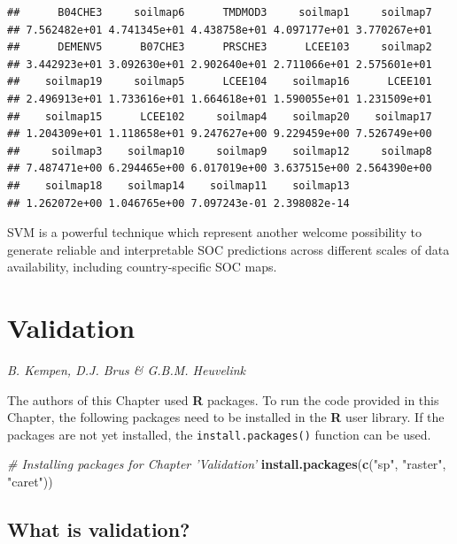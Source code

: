 \documentclass[10pt,b5paper,]{book}
\newenvironment{Shaded}{\begin{snugshade}}{\end{snugshade}}
\newcommand{\CommentTok}[1]{\textcolor[rgb]{0.56,0.35,0.01}{\textit{#1}}}
\newcommand{\KeywordTok}[1]{\textcolor[rgb]{0.13,0.29,0.53}{\textbf{#1}}}
\newcommand{\NormalTok}[1]{#1}
\newcommand{\StringTok}[1]{\textcolor[rgb]{0.31,0.60,0.02}{#1}}
\theoremstyle{definition}
\theoremstyle{definition}
\theoremstyle{definition}
\theoremstyle{remark}
\begin{document}
\begin{verbatim}
##      B04CHE3     soilmap6      TMDMOD3     soilmap1     soilmap7 
## 7.562482e+01 4.741345e+01 4.438758e+01 4.097177e+01 3.770267e+01 
##      DEMENV5      B07CHE3      PRSCHE3      LCEE103     soilmap2 
## 3.442923e+01 3.092630e+01 2.902640e+01 2.711066e+01 2.575601e+01 
##    soilmap19     soilmap5      LCEE104    soilmap16      LCEE101 
## 2.496913e+01 1.733616e+01 1.664618e+01 1.590055e+01 1.231509e+01 
##    soilmap15      LCEE102     soilmap4    soilmap20    soilmap17 
## 1.204309e+01 1.118658e+01 9.247627e+00 9.229459e+00 7.526749e+00 
##     soilmap3    soilmap10     soilmap9    soilmap12     soilmap8 
## 7.487471e+00 6.294465e+00 6.017019e+00 3.637515e+00 2.564390e+00 
##    soilmap18    soilmap14    soilmap11    soilmap13 
## 1.262072e+00 1.046765e+00 7.097243e-01 2.398082e-14
\end{verbatim}

SVM is a powerful technique which represent another welcome possibility
to generate reliable and interpretable SOC predictions across different
scales of data availability, including country-specific SOC maps.

\hypertarget{chvalidation}{%
\chapter{Validation}\label{chvalidation}}

\emph{B. Kempen, D.J. Brus \& G.B.M. Heuvelink}

The authors of this Chapter used \textbf{R} packages. To run the code
provided in this Chapter, the following packages need to be installed in
the \textbf{R} user library. If the packages are not yet installed, the
\texttt{install.packages()} function can be used.

\begin{Shaded}
\begin{Highlighting}[]
\CommentTok{# Installing packages for Chapter 'Validation'}
\KeywordTok{install.packages}\NormalTok{(}\KeywordTok{c}\NormalTok{(}\StringTok{"sp"}\NormalTok{, }\StringTok{"raster"}\NormalTok{, }\StringTok{"caret"}\NormalTok{))}
\end{Highlighting}
\end{Shaded}

\hypertarget{what-is-validation}{%
\section{What is validation?}\label{what-is-validation}}
\end{document}
